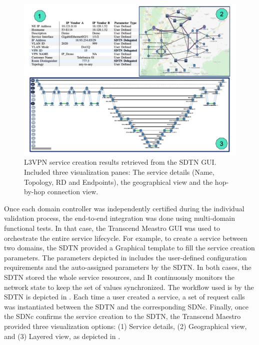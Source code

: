 \documentclass[10pt, conference]{IEEEtran}
\begin{document}
\begin{figure}
	\centering
		\includegraphics[width=\linewidth]{figs/diagram-14.png}
	\caption{L3VPN service creation results retrieved from the SDTN GUI. Included three visualization panes: The service details (Name, Topology, RD and Endpoints), the geographical view and the hop-by-hop connection view.}
	\label{FIG:l3vpn_results}
\end{figure}


Once each domain controller was independently certified during the individual validation process, the end-to-end integration was done using multi-domain functional tests. In that case, the Transcend Meastro GUI was used to orchestrate the entire service lifecycle. For example,  to create a service between two domains, the SDTN provided a Graphical template to fill the service creation parameters. The parameters depicted in  includes the user-defined configuration requirements and the auto-assigned parameters by the SDTN. In both cases, the SDTN stored the whole service resources, and It continuously monitors the network state to keep the set of values synchronized. The workflow used is by the SDTN is depicted in . Each time a user created a service, a set of request calls was instantiated between the SDTN and the corresponding SDNc. Finally, once the SDNc confirms the service creation to the SDTN, the Transcend Maestro provided three visualization options: (1) Service details, (2) Geographical view, and (3) Layered view, as depicted in .

\end{document}
